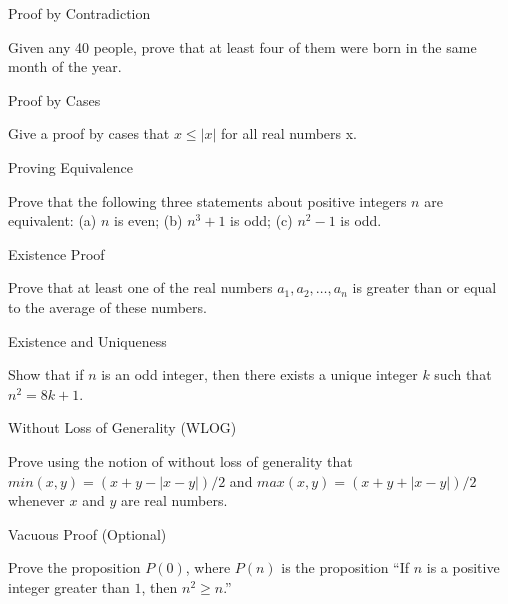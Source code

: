\documentclass{beamer}
\begin{document}
\begin{frame}[t]{Proof by Contradiction}
    \begin{example}
        Given any 40 people, prove that at least four of them were born in the same month of the year.
    \end{example}
\end{frame}

\begin{frame}[t]{Proof by Cases}
    \begin{example}
        Give a proof by cases that $x \leq |x|$ for all real numbers x.
    \end{example}
\end{frame}

\begin{frame}[t]{Proving Equivalence}
    \begin{example}
        Prove that the following three statements about positive integers $n$ are equivalent: (a) $n$ is even; (b) $n^3 + 1$ is odd; (c) $n^2 - 1$ is odd.
    \end{example}
\end{frame}

\begin{frame}
\end{frame}

\begin{frame}[t]{Existence Proof}
    \begin{example}
        Prove that at least one of the real numbers $a_1, a_2, \dots, a_n$ is greater than or equal to the average of these numbers.
    \end{example}
\end{frame}

\begin{frame}[t]{Existence and Uniqueness}
    \begin{example}
        Show that if $n$ is an odd integer, then there exists a unique integer $k$ such that $n^2 = 8k + 1$.
    \end{example}
\end{frame}

\begin{frame}
\end{frame}

\begin{frame}[t]{Without Loss of Generality (WLOG)}
    \begin{example}
        Prove using the notion of without loss of generality that $min(x, y) = (x + y - |x - y|)/2$ and $max(x, y) = (x + y + |x - y|)/2$ whenever $x$ and $y$ are real numbers.
    \end{example}
\end{frame}

\begin{frame}[t]{Vacuous Proof (Optional)}
    \begin{example}
        Prove the proposition $P(0)$, where $P(n)$ is the proposition ``If $n$ is a positive integer greater than $1$, then $n^2 \geq n$.''
    \end{example}
\end{frame}
\end{document}
